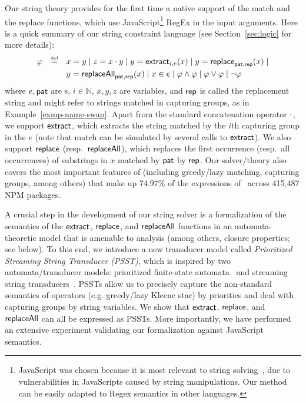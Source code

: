 Our string theory provides for the first time a native support of the match and the 
replace functions, which use JavaScript\footnote{JavaScript was chosen 
because it is most relevant to string solving~\cite{BEK,Berkeley-JavaScript}, due to vulnerabilities in JavaScripts 
caused by string manipulations. Our method can be easily adapted to Regex
semantics in other languages.} RegEx in the input arguments. Here is a quick
summary of our string constraint language (see Section~\ref{sec:logic} for
more details):
\[
\begin{array}{l c l}
\smallskip
\varphi & \eqdef  & x = y \mid z = x \concat y \mid y  = \extract_{i, e}(x) \mid
y  = \replace_{\pat, \rep}(x) \mid 
\\
& & y = \replaceall_{\pat, \rep}(x)   \mid
 x \in e \mid \varphi \wedge \varphi \mid \varphi \vee \varphi \mid \neg \varphi \
\label{eq:SL}
\end{array}
\]
where $e, \mathsf{pat}$ are \regexp{}s, $i \in \mathbb{N}$, $x,y,z$ are variables, and $\mathsf{rep}$ 
is called the
replacement string and might refer to strings matched in capturing groups,
as in Example~\ref{exmp-name-swap}. Apart from the standard concatenation
operator $\cdot$, we support $\mathsf{extract}$, which extracts the string matched by
the $i$th capturing group in the \regexp{} $e$ (note that match can be simulated
by several calls to $\mathsf{extract}$). We also support $\mathsf{replace}$ 
(resp.~$\mathsf{replaceAll}$), which replaces the first occurrence (resp.~all
occurrences) of substrings in $x$ matched by $\mathsf{pat}$ by $\mathsf{rep}$. Our solver/theory
also covers the most important features of \regexp{} (including greedy/lazy
matching, capturing groups, among others) that make up 74.97\% of the \regexp{}
expressions of~\cite{LMK19} across 415,487 NPM packages. 

A crucial step in the development of our string solver is a formalization of
the semantics of the $\mathsf{extract}$, $\mathsf{replace}$, and $\mathsf{replaceAll}$ functions in
an automata-theoretic model that is amenable to analysis (among others, closure
properties; see below).
%
To this end, we introduce a new 
transducer model called \emph{Prioritized Streaming String Transducer (PSST)},
which is inspired by %
two automata/transducer models: prioritized finite-state automata~\cite{BM17} 
and streaming string transducers~\cite{AC10,AD11}. PSSTs allow us to precisely
capture the non-standard semantics of \regexp{} operators (e.g. greedy/lazy Kleene star) by priorities and 
deal with capturing groups by string variables. 
We show that $\mathsf{extract}$, $\mathsf{replace}$, and $\mathsf{replaceAll}$ can all be expressed as 
PSSTs. More importantly, we have performed an extensive experiment
validating our formalization against JavaScript semantics. 

